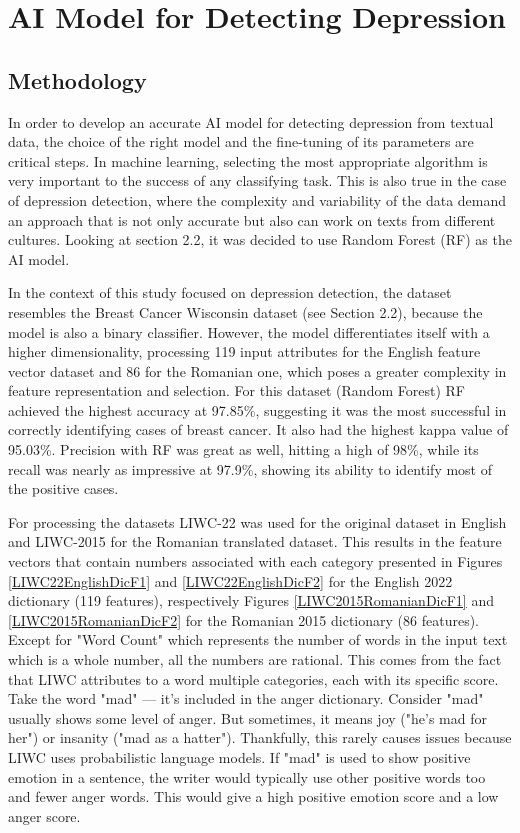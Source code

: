 \chapter{AI Model for Detecting Depression}

\label{chap:ch4}

\section{Methodology}

\quad In order to develop an accurate AI model for detecting depression from textual data, the choice of the right model and the fine-tuning of its parameters are critical steps. In machine learning, selecting the most appropriate algorithm is very important to the success of any classifying task. This is also true in the case of depression detection, where the complexity and variability of the data demand an approach that is not only accurate but also can work on texts from different cultures. Looking at section 2.2, it was decided to use Random Forest (RF) as the AI model. 

In the context of this study focused on depression detection, the dataset resembles the Breast Cancer Wisconsin dataset (see Section 2.2), because the model is also a binary classifier. However, the model differentiates itself with a higher dimensionality, processing 119 input attributes for the English feature vector dataset and 86 for the Romanian one, which poses a greater complexity in feature representation and selection. For this dataset (Random Forest) RF achieved the highest accuracy at 97.85\%, suggesting it was the most successful in correctly identifying cases of breast cancer. It also had the highest kappa value of 95.03\%. Precision with RF was great as well, hitting a high of 98\%, while its recall was nearly as impressive at 97.9\%, showing its ability to identify most of the positive cases.

For processing the datasets LIWC-22 was used for the original dataset in English and LIWC-2015 for the Romanian translated dataset. This results in the feature vectors that contain numbers associated with each category presented in Figures \ref{LIWC22EnglishDicF1} and \ref{LIWC22EnglishDicF2} for the English 2022 dictionary (119 features), respectively Figures \ref{LIWC2015RomanianDicF1} and \ref{LIWC2015RomanianDicF2} for the Romanian 2015 dictionary (86 features). Except for "Word Count" which represents the number of words in the input text which is a whole number, all the numbers are rational. This comes from the fact that LIWC attributes to a word multiple categories, each with its specific score. Take the word "mad" — it's included in the anger dictionary. Consider "mad" usually shows some level of anger. But sometimes, it means joy ("he’s mad for her") or insanity ("mad as a hatter"). Thankfully, this rarely causes issues because LIWC uses probabilistic language models. If "mad" is used to show positive emotion in a sentence, the writer would typically use other positive words too and fewer anger words. This would give a high positive emotion score and a low anger score.

